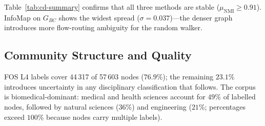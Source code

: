 Table~\ref{tab:cd-summary} confirms that all three methods are stable ($\mu_{\text{NMI}} \geq 0.91$).  InfoMap on $G_{BC}$ shows the widest spread ($\sigma = 0.037$)---the denser graph introduces more flow-routing ambiguity for the random walker.

\subsection{Community Structure and Quality}
\label{subsec:cd:results}

FOS L4 labels cover 44\,317 of 57\,603 nodes ($76.9\%$); the remaining $23.1\%$ introduces uncertainty in any disciplinary classification that follows.  The corpus is biomedical-dominant: medical and health sciences account for $49\%$ of labelled nodes, followed by natural sciences ($36\%$) and engineering ($21\%$; percentages exceed $100\%$ because nodes carry multiple labels).

\begin{table}[t]

  \centering\footnotesize
    \caption{Ensemble stability and medoid partition statistics.
           $\mu_{\text{NMI}}$: mean pairwise NMI across runs;
           Medoid: that run's mean NMI to all others.
           Leiden: $\gamma = 0.154$; ANGEL: threshold $= 0.45$,
           min\_size $= 4$.  Med.: median community size.}
  \label{tab:cd-summary}
\end{table}

